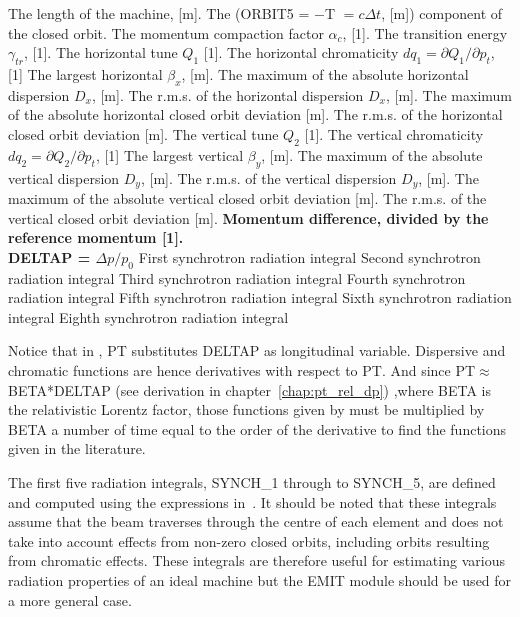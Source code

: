 \begin{madlist}
	 The length of the machine, [m].     
	 The (ORBIT5 = $-$T $= c \Delta t$, [m]) component of the closed orbit.     
	 The momentum compaction factor $\alpha_c$, [1].     
	 The transition energy $\gamma_{tr}$, [1].     
	 The horizontal tune $Q_1$ [1].     
	 The horizontal chromaticity $dq_1 = \partial Q_1 / \partial p_t$, [1]
	 The largest horizontal $\beta_x$, [m].     
	 The maximum of the absolute horizontal dispersion $D_x$, [m].     
	 The r.m.s. of the horizontal dispersion $D_x$, [m].     
	 The maximum of the absolute horizontal closed orbit deviation [m].     
	 The r.m.s. of the horizontal closed orbit deviation [m].     
	 The vertical tune $Q_2$ [1].     
	 The vertical chromaticity $dq_2 = \partial Q_2 / \partial p_t$, [1]
	 The largest vertical $\beta_y$, [m].     
	 The maximum of the absolute vertical dispersion $D_y$, [m].     
	 The r.m.s. of the vertical dispersion $D_y$, [m].     
	 The maximum of the absolute vertical closed orbit deviation [m].     
	 The r.m.s. of the vertical closed orbit deviation [m].     
	 \textbf{Momentum difference, divided by the reference
	momentum [1]. \\ DELTAP = $\Delta p / p_0$}
	 First synchrotron radiation integral  
	 Second synchrotron radiation integral  
	 Third synchrotron radiation integral  
	 Fourth synchrotron radiation integral  
	 Fifth synchrotron radiation integral    
	 Sixth synchrotron radiation integral  
	 Eighth synchrotron radiation integral  
\end{madlist}

Notice that in \madx, PT substitutes DELTAP as longitudinal
variable. Dispersive and chromatic functions are hence derivatives with
respect to PT.
And since PT$\approx$BETA*DELTAP (see derivation in chapter~\ref{chap:pt_rel_dp})
,where BETA is the relativistic Lorentz 
factor, those functions given by \madx must be multiplied by BETA a
number of time equal to the order of the derivative to find the
functions given in the literature. 

The first five radiation integrals, SYNCH\_1 through to SYNCH\_5, 
are defined and computed using the expressions in~\cite{Helm1973}. 
It should be noted that these integrals assume that the beam traverses 
through the centre of each element and does not take into account effects 
from non-zero closed orbits, including orbits resulting from chromatic effects. 
These integrals are therefore useful for estimating various radiation 
properties of an ideal machine but the EMIT module should be used for 
a more general case. 

